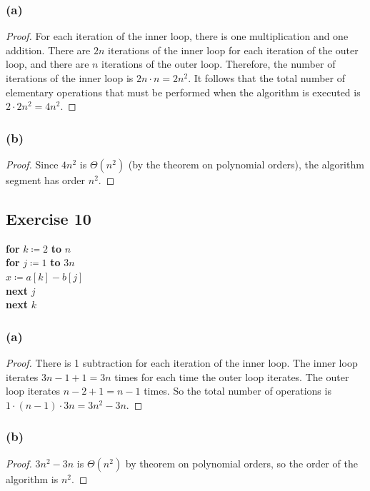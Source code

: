 \documentclass[14pt]{extarticle}
\begin{document}
\subsubsection{(a)}
\begin{proof}
For each iteration of the inner loop, there is one multiplication and one addition. There are \(2n\) iterations 
of the inner loop for each iteration of the outer loop, and there are \(n\) iterations of the outer loop. Therefore, the 
number of iterations of the inner loop is \(2n \cdot n = 2n^2\). It follows that the total number of elementary 
operations that must be performed when the algorithm is executed is \(2 \cdot 2n^2 = 4n^2\).
\end{proof}

\subsubsection{(b)}
\begin{proof}
Since \(4n^2\) is \(\Theta(n^2)\) (by the theorem on polynomial orders), the algorithm segment has order \(n^2\).
\end{proof}

\subsection{Exercise 10}
\begin{tabbing}
{\bf for} \= \(k \coloneqq 2\) {\bf to} \(n\) \\
          \> {\bf for} \= \(j \coloneqq 1\) {\bf to} \(3n\) \\
          \>           \> \(x \coloneqq a[k] - b[j]\) \\
          \> {\bf next} \(j\) \\
{\bf next} \(k\)
\end{tabbing}

\subsubsection{(a)}
\begin{proof}
There is 1 subtraction for each iteration of the inner loop. The inner loop iterates \(3n-1+1 = 3n\) times for each time
the outer loop iterates. The outer loop iterates \(n-2+1 = n-1\) times. So the total number of operations is 
\(1 \cdot (n-1) \cdot 3n = 3n^2 - 3n\).
\end{proof}

\subsubsection{(b)}
\begin{proof}
\(3n^2 - 3n\) is \(\Theta(n^2)\) by theorem on polynomial orders, so the order of the algorithm is \(n^2\).
\end{proof}
\end{document}
